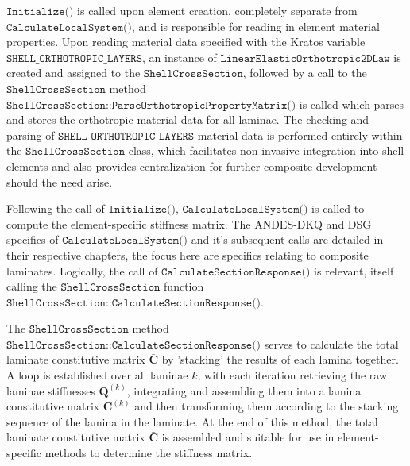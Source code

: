 $\texttt{Initialize()}$ is called upon element creation, completely separate from \linebreak$\texttt{CalculateLocalSystem()}$, and is responsible for reading in element material properties. Upon reading material data specified with the Kratos variable $\texttt{SHELL\_ORTHOTROPIC\_LAYERS}$, an instance of $\texttt{LinearElasticOrthotropic2DLaw}$ is created and assigned to the \linebreak$\texttt{ShellCrossSection}$, followed by a call to the $\texttt{ShellCrossSection}$ method \linebreak$\texttt{ShellCrossSection::ParseOrthotropicPropertyMatrix()}$ is called which parses and stores the orthotropic material data for all laminae. The checking and parsing of \linebreak$\texttt{SHELL\_ORTHOTROPIC\_LAYERS}$ material data is performed entirely within the \linebreak $\texttt{ShellCrossSection}$ class, which facilitates non-invasive integration into shell elements and also provides centralization for further composite development should the need arise.

Following the call of $\texttt{Initialize()}$, $\texttt{CalculateLocalSystem()}$ is called to compute the element-specific stiffness matrix. The ANDES-DKQ and DSG specifics of \linebreak $\texttt{CalculateLocalSystem()}$ and it's subsequent calls are detailed in their respective chapters, the focus here are specifics relating to composite laminates. Logically, the call of $\texttt{CalculateSectionResponse()}$ is relevant, itself calling the $\texttt{ShellCrossSection}$ function \linebreak$\texttt{ShellCrossSection::CalculateSectionResponse()}$.

The $\texttt{ShellCrossSection}$ method $\texttt{ShellCrossSection::CalculateSectionResponse()}$ \linebreak serves to calculate the total laminate constitutive matrix $\bar{\mathbf{C}}$ by 'stacking' the results of each lamina together. A loop is established over all laminae $k$, with each iteration retrieving the raw laminae stiffnesses $\mathbf{Q}^{(k)}$, integrating and assembling them into a lamina constitutive matrix $\mathbf{C}^{(k)}$ and then transforming them according to the stacking sequence of the lamina in the laminate. At the end of this method, the total laminate constitutive matrix $\bar{\mathbf{C}}$ is assembled and suitable for use in element-specific methods to determine the stiffness matrix. 

